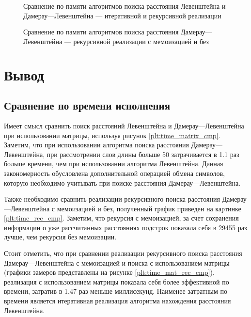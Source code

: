 \begin{figure}[H]
	\centering
	
	\caption{Сравнение по памяти алгоритмов поиска расстояния Левенштейна и Дамерау---Левенштейна --- итеративной и рекурсивной реализации}
	\label{plt:memory_mat_rec}
\end{figure}



\begin{figure}[H]
	\centering
	
	\caption{Сравнение по памяти алгоритмов поиска расстояния Дамерау---Левенштейна --- рекурсивной реализации с мемоизацией и без}
	\label{plt:memory_rec}
\end{figure}

\clearpage

\section{Вывод}

\subsection{Сравнение по времени исполнения}
Имеет смысл сравнить поиск расстояний Левенштейна и Дамерау---Левенштейна при использовании матрицы, используя рисунок
\ref{plt:time_matrix_cmp}. Заметим, что при использовании
алгоритма поиска расстояния Дамерау---Левенштейна, при рассмотрении слов длины больше 50 затрачивается в 1.1 раз больше времени, чем 
при использовании алгоритма Левенштейна. Данная закономерность обусловлена дополнительной операцией обмена символов, которую 
необходимо учитывать при поиске расстояния Дамерау---Левенштейна.

Также необходимо сравнить реализации рекурсивного поиска расстояния Дамерау---Левенштейна с мемоизацией и без, полученный график приведен
на картинке \ref{plt:time_rec_cmp}. Заметим, что рекурсия с мемоизацией, за счет сохранения информации о уже рассчитанных расстояниях подстрок
показала себя в 29455 раз лучше, чем рекурсия без мемоизации. 

Стоит отметить, что при сравнении реализации рекурсивного поиска расстояния Дамерау---Левенштейна с  мемоизацией и поиска
с использованием матрицы (графики замеров представлены на рисунке \ref{plt:time_mat_rec_cmp}), реализация с использованием матрицы показала себя более эффективной
по времени, затратив в 1,47 раз меньше миллисекунд. 
Наименее затратным по времени является итеративная реализация  алгоритма нахождения расстояния Левенштейна.

